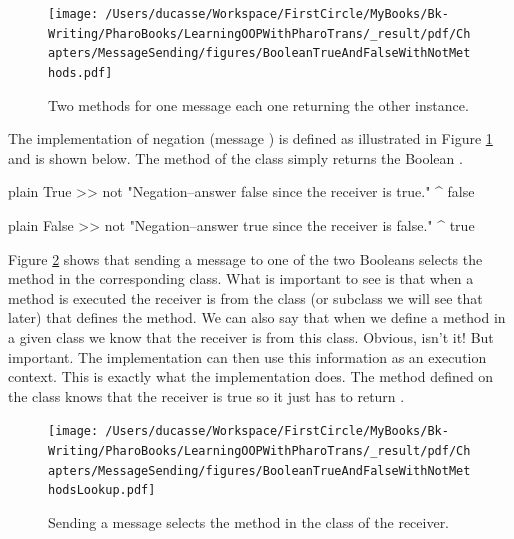 \documentclass[10pt,twoside,english]{_support/latex/sbabook/sbabook}
\begin{document}
\begin{figure}

\begin{center}
\texttt{[image: /Users/ducasse/Workspace/FirstCircle/MyBooks/Bk-Writing/PharoBooks/LearningOOPWithPharoTrans/\_result/pdf/Chapters/MessageSending/figures/BooleanTrueAndFalseWithNotMethods.pdf]}\caption{Two methods for one message each one returning the other instance.\label{figTrueFalseSolution}}\end{center}
\end{figure}


The implementation of negation (message ) is defined as illustrated in Figure \ref{figTrueFalseSolution} and is shown below. The method  of the class  simply returns the Boolean . 

\begin{displaycode}{plain}
True >> not
   "Negation--answer false since the receiver is true."
   ^ false
\end{displaycode}

\begin{displaycode}{plain}
False >> not
   "Negation--answer true since the receiver is false."
   ^ true
\end{displaycode}

Figure \ref{figTrueFalseSolutionLookup} shows that sending a message to one of the two Booleans selects the method in the corresponding class. What is important to see is that when a method is executed the receiver is from the class (or subclass we will see that later) that defines the method. We can also say that when we define a method in a given class we know that the receiver is from this class. Obvious, isn't it! But important. The implementation can then use this information as an execution context. This is exactly what the  implementation does. The method  defined on the class  knows that the receiver is true so it just has to return . 


\begin{figure}

\begin{center}
\texttt{[image: /Users/ducasse/Workspace/FirstCircle/MyBooks/Bk-Writing/PharoBooks/LearningOOPWithPharoTrans/\_result/pdf/Chapters/MessageSending/figures/BooleanTrueAndFalseWithNotMethodsLookup.pdf]}\caption{Sending a message selects the method in the class of the receiver.\label{figTrueFalseSolutionLookup}}\end{center}
\end{figure}
\end{document}
